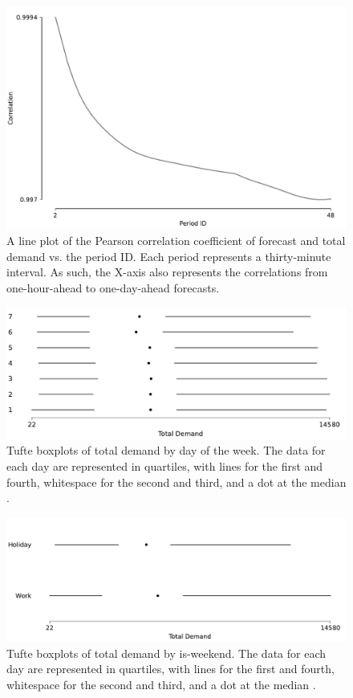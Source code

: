 \documentclass[mstat,12pt]{unswthesis}
\begin{document}
\begin{figure}[H]
\centerline{\includegraphics[width=0.8\columnwidth]{Figures/Plots/Forecast vs. actual correlation by Period ID.pdf}}
\caption{A line plot of the Pearson correlation coefficient of forecast and total demand vs. the period ID. Each period represents a thirty-minute interval. As such, the X-axis also represents the correlations from one-hour-ahead to one-day-ahead forecasts.}
\label{corr_by_per}
\end{figure}

\begin{figure}[H]
\centerline{\includegraphics[width=0.8\columnwidth]{Figures/Plots/Demand by day boxplots.pdf}}
\caption{Tufte boxplots of total demand by day of the week. The data for each day are represented in quartiles, with lines for the first and fourth, whitespace for the second and third, and a dot at the median \cite{tufte}.}
\label{dem_by_day}
\end{figure}

\begin{figure}[H]
\centerline{\includegraphics[width=0.8\columnwidth]{Figures/Plots/Demand by is-weekend boxplots.pdf}}
\caption{Tufte boxplots of total demand by is-weekend. The data for each day are represented in quartiles, with lines for the first and fourth, whitespace for the second and third, and a dot at the median \cite{tufte}.}
\label{is_weekend}
\end{figure}
\end{document}
